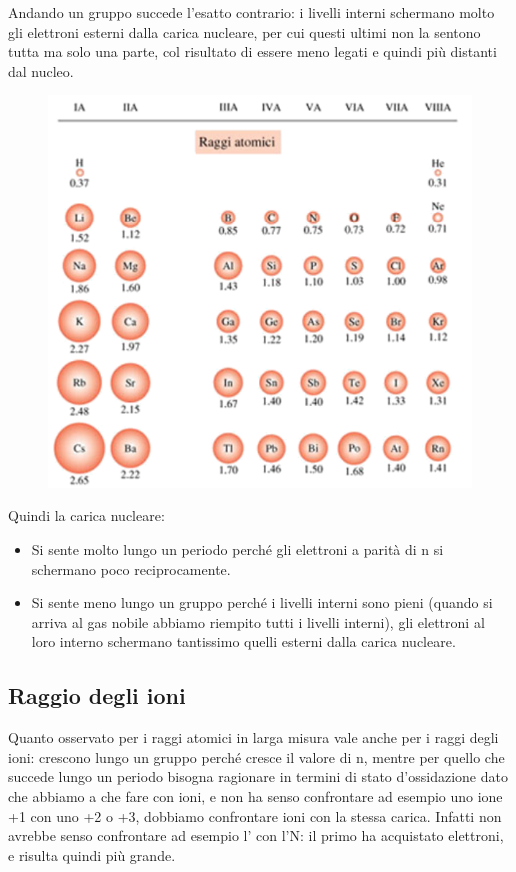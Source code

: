 Andando un gruppo succede l'esatto contrario: i livelli interni schermano molto gli elettroni esterni dalla carica nucleare, per cui questi ultimi non la sentono tutta ma solo una parte, col risultato di essere meno legati e quindi più distanti dal nucleo.

\begin{figure}[htp]
    \centering
    \includegraphics[width=12cm]{immagini/raggi-atomici.png}
\end{figure}

Quindi la carica nucleare:
\begin{itemize}
    \item Si sente molto lungo un periodo perché gli elettroni a parità di n si schermano poco reciprocamente.
    \item Si sente meno lungo un gruppo perché i livelli interni sono pieni (quando si arriva al gas nobile abbiamo riempito tutti i livelli interni), gli elettroni al loro interno schermano tantissimo quelli esterni dalla carica nucleare.
\end{itemize}
\subsection{Raggio degli ioni}
Quanto osservato per i raggi atomici in larga misura vale anche per i raggi degli ioni: crescono lungo un gruppo perché cresce il valore di n, mentre per quello che succede lungo un periodo bisogna ragionare in termini di stato d'ossidazione dato che abbiamo a che fare con ioni, e non ha senso confrontare ad esempio uno ione +1 con uno +2 o +3, dobbiamo confrontare ioni con la stessa carica. Infatti non avrebbe senso confrontare ad esempio l' con l'N: il primo ha acquistato elettroni, e risulta quindi più grande.

